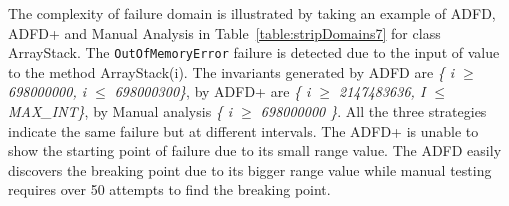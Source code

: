 
The complexity of failure domain is illustrated by taking an example of ADFD, ADFD+ and Manual Analysis in Table~\ref{table:stripDomains7} for class ArrayStack. The \verb+OutOfMemoryError+ failure is detected due to the input of value to the method ArrayStack(i). The invariants generated by ADFD are \textit{\{ i $\ge$ 698000000, i $\le$ 698000300\}}, by ADFD+ are \textit{\{ i $\ge$ 2147483636, I $\le$ MAX\_INT\}}, by Manual analysis \textit{\{ i $\ge$ 698000000 \}}. All the three strategies indicate the same failure but at different intervals. The ADFD+ is unable to show the starting point of failure due to its small range value. The ADFD easily discovers the breaking point due to its bigger range value while manual testing requires over 50 attempts to find the breaking point.











